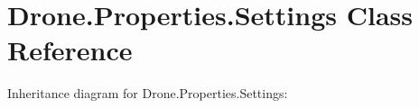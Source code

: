 \hypertarget{class_drone_1_1_properties_1_1_settings}{}\section{Drone.\+Properties.\+Settings Class Reference}
\label{class_drone_1_1_properties_1_1_settings}


Inheritance diagram for Drone.\+Properties.\+Settings\+:
